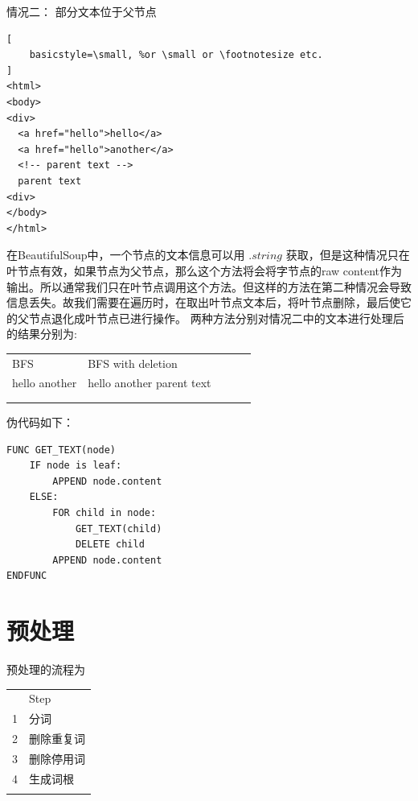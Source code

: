 \documentclass{article}
\begin{document}
\begin{CJK*}{UTF8}{gbsn}
\begin{multicols}{2}
\columnbreak
\color{blue}
情况二： 部分文本位于父节点
\color{black}
\begin{lstlisting}[
    basicstyle=\small, %or \small or \footnotesize etc.
]
<html>
<body>
<div>
  <a href="hello">hello</a>
  <a href="hello">another</a>
  <!-- parent text -->
  parent text
<div>
</body>
</html>
\end{lstlisting}
\end{multicols}
在BeautifulSoup\cite{soup}中，一个节点的文本信息可以用 $.string$ 获取，但是这种情况只在叶节点有效，如果节点为父节点，那么这个方法将会将字节点的raw content作为输出。所以通常我们只在叶节点调用这个方法。但这样的方法在第二种情况会导致信息丢失。故我们需要在遍历时，在取出叶节点文本后，将叶节点删除，最后使它的父节点退化成叶节点已进行操作。\newline\newline
两种方法分别对情况二中的文本进行处理后的结果分别为:\newline
\begin{table}[H]
\begin{tabular}{lllll}
\cline{1-2}
\multicolumn{1}{|l|}{BFS}           & \multicolumn{1}{l|}{BFS with deletion}         &  &  &  \\ \cline{1-2}
\multicolumn{1}{|l|}{hello another} & \multicolumn{1}{l|}{hello another parent text} &  &  &  \\ \cline{1-2}
                                    &                                                &  &  &  \\
                                    &                                                &  &  & 
\end{tabular}
\end{table}
伪代码如下：
\begin{lstlisting}
FUNC GET_TEXT(node)
	IF node is leaf:
		APPEND node.content
	ELSE:
		FOR child in node:
			GET_TEXT(child)
			DELETE child
		APPEND node.content
ENDFUNC
\end{lstlisting}


\section{预处理}

预处理的流程为
\begin{table}[H]
\begin{tabular}{ll}
  & Step  \\
1 & 分词    \\
2 & 删除重复词 \\
3 & 删除停用词 \\
4 & 生成词根  \\
  &      
\end{tabular}
\end{table}

\end{CJK*}
\end{document}

